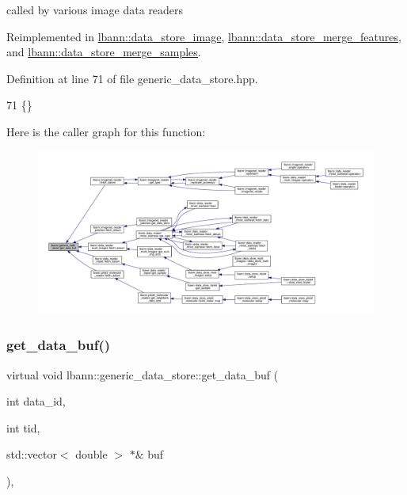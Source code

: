 called by various image data readers 



Reimplemented in \hyperlink{classlbann_1_1data__store__image_aa9e47fb3cad58dda4eaddcccc9bfa523}{lbann\+::data\+\_\+store\+\_\+image}, \hyperlink{classlbann_1_1data__store__merge__features_ac95dff58de75fba572f34d56ceec3732}{lbann\+::data\+\_\+store\+\_\+merge\+\_\+features}, and \hyperlink{classlbann_1_1data__store__merge__samples_a8b81d947c1f05c38b7f979ce7e3cef97}{lbann\+::data\+\_\+store\+\_\+merge\+\_\+samples}.



Definition at line 71 of file generic\+\_\+data\+\_\+store.\+hpp.


\begin{DoxyCode}
71 \{\}
\end{DoxyCode}
Here is the caller graph for this function\+:\nopagebreak
\begin{figure}[H]
\begin{center}
\leavevmode
\includegraphics[width=350pt]{classlbann_1_1generic__data__store_a2abb3d0327b528d36e23fcef9b937798_icgraph}
\end{center}
\end{figure}
\mbox{\label{classlbann_1_1generic__data__store_abc3fecd958650a74e76070ea4f394bea}} 
\subsubsection{\texorpdfstring{get\+\_\+data\+\_\+buf()}{get\_data\_buf()}\hspace{0.1cm}{\footnotesize\ttfamily [2/2]}}
{\footnotesize\ttfamily virtual void lbann\+::generic\+\_\+data\+\_\+store\+::get\+\_\+data\+\_\+buf (\begin{DoxyParamCaption}\item[{int}]{data\+\_\+id,  }\item[{int}]{tid,  }\item[{std\+::vector$<$ double $>$ $\ast$\&}]{buf }\end{DoxyParamCaption})\hspace{0.3cm}{\ttfamily [inline]}, {\ttfamily [virtual]}}



